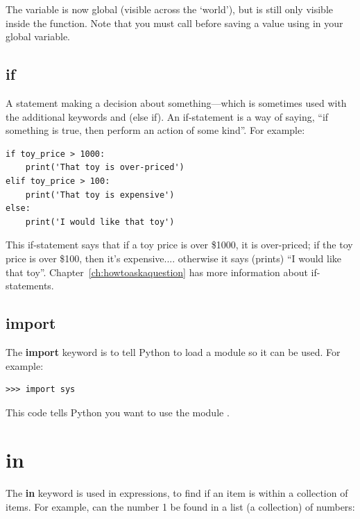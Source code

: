 The variable  is now global (visible across the `world'), but  is still only visible inside the function.  Note that you must call  before saving a value using in your global variable.

\subsection*{if}

A statement making a decision about something---which is sometimes used with the additional keywords  and  (else if).  An if-statement is a way of saying, ``if something is true, then perform an action of some kind''.  For example:

\begin{listing}
\begin{verbatim}
if toy_price > 1000:
    print('That toy is over-priced')
elif toy_price > 100:
    print('That toy is expensive')
else:
    print('I would like that toy')
\end{verbatim}
\end{listing}

This if-statement says that if a toy price is over \$1000, it is over-priced; if the toy price is over \$100, then it's expensive.... otherwise it says (prints) ``I would like that toy''. Chapter~\ref{ch:howtoaskaquestion} has more information about if-statements.

\subsection*{import}

The \textbf{import} keyword is to tell Python to load a module so it can be used. For example:

\begin{listing}
\begin{verbatim}
>>> import sys
\end{verbatim}
\end{listing}

This code tells Python you want to use the module .

\section*{in}

The \textbf{in} keyword is used in expressions, to find if an item is within a collection of items. For example, can the number 1 be found in a list (a collection) of numbers:


